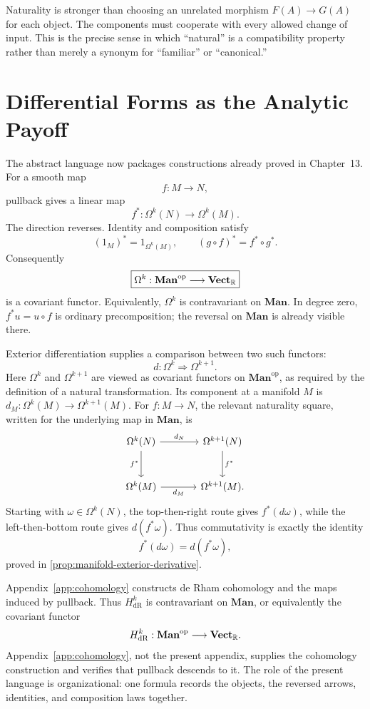 Naturality is stronger than choosing an unrelated morphism
$F(A)\to G(A)$ for each object. The components must cooperate with every
allowed change of input. This is the precise sense in which ``natural'' is a
compatibility property rather than merely a synonym for ``familiar'' or
``canonical.''

\section{Differential Forms as the Analytic Payoff}
The abstract language now packages constructions already proved in
Chapter~13. For a smooth map
\[
f:M\longrightarrow N,
\]
pullback gives a linear map
\[
f^*:\Omega^k(N)\longrightarrow\Omega^k(M).
\]
The direction reverses. Identity and composition satisfy
\[
(1_M)^*=1_{\Omega^k(M)},
\qquad
(g\circ f)^*=f^*\circ g^*.
\]
Consequently
\[
\boxed{\Omega^k:\mathbf{Man}^{\mathrm{op}}
\longrightarrow\mathbf{Vect}_{\mathbb{R}}}
\]
is a covariant functor. Equivalently, \(\Omega^k\) is contravariant on
\(\mathbf{Man}\). In degree zero, $f^*u=u\circ f$ is ordinary
precomposition; the reversal on \(\mathbf{Man}\) is already visible there.

Exterior differentiation supplies a comparison between two such functors:
\[
d:\Omega^k\Rightarrow\Omega^{k+1}.
\]
Here \(\Omega^k\) and \(\Omega^{k+1}\) are viewed as covariant functors on
\(\mathbf{Man}^{\mathrm{op}}\), as required by the definition of a natural
transformation.
Its component at a manifold $M$ is
$d_M:\Omega^k(M)\to\Omega^{k+1}(M)$. For $f:M\to N$, the relevant
naturality square, written for the underlying map in \(\mathbf{Man}\), is
\[
\begin{tikzcd}[column sep=large,row sep=large]
\Omega^k(N) \arrow[r,"d_N"] \arrow[d,"f^*"'] &
\Omega^{k+1}(N) \arrow[d,"f^*"]\\
\Omega^k(M) \arrow[r,"d_M"'] & \Omega^{k+1}(M).
\end{tikzcd}
\]
Starting with $\omega\in\Omega^k(N)$, the top-then-right route gives
$f^*(d\omega)$, while the left-then-bottom route gives $d(f^*\omega)$.
Thus commutativity is exactly the identity
\[
\boxed{f^*(d\omega)=d(f^*\omega),}
\]
proved in \cref{prop:manifold-exterior-derivative}.

Appendix~\ref{app:cohomology} constructs de Rham cohomology and the maps
induced by pullback. Thus \(H^k_{\mathrm{dR}}\) is contravariant on
\(\mathbf{Man}\), or equivalently the covariant functor
\[
H^k_{\mathrm{dR}}:
\mathbf{Man}^{\mathrm{op}}\longrightarrow\mathbf{Vect}_{\mathbb{R}}.
\]
Appendix~\ref{app:cohomology}, not the present appendix, supplies the
cohomology construction and verifies that pullback descends to it. The role
of the present language is organizational: one formula records the objects,
the reversed arrows, identities, and composition laws together.

